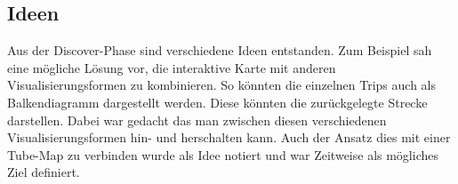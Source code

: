 \subsection{Ideen}
\label{ssub:ideen}
  Aus der Discover-Phase sind verschiedene Ideen entstanden. Zum Beispiel sah eine mögliche Lösung vor, die interaktive Karte mit anderen Visualisierungsformen zu kombinieren. So könnten die einzelnen Trips auch als Balkendiagramm dargestellt werden. Diese könnten die zurückgelegte Strecke darstellen. Dabei war gedacht das man zwischen diesen verschiedenen Visualisierungsformen hin- und herschalten kann. Auch der Ansatz dies mit einer Tube-Map zu verbinden wurde als Idee notiert und war Zeitweise als mögliches Ziel definiert. 

